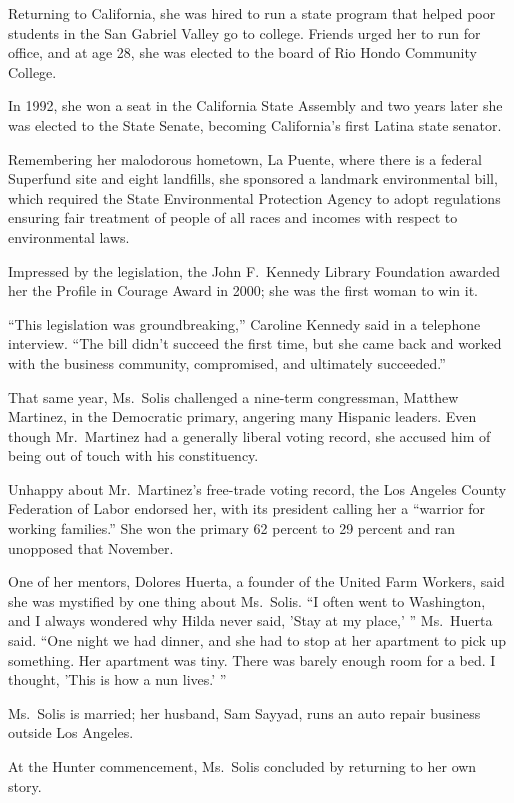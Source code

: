 ﻿\documentclass[12pt]{article}
\begin{document}
Returning to California, she was hired to run a state program that helped poor students in the San
Gabriel Valley go to college. Friends urged her to run for office, and at age 28, she was elected to
the board of Rio Hondo Community College.

In 1992, she won a seat in the California State Assembly and two years later she was elected to the
State Senate, becoming California's first Latina state senator.

Remembering her malodorous hometown, La Puente, where there is a federal Superfund site and eight
landfills, she sponsored a landmark environmental bill, which required the State Environmental
Protection Agency to adopt regulations ensuring fair treatment of people of all races and incomes
with respect to environmental laws.

Impressed by the legislation, the John F.~Kennedy Library Foundation awarded her the Profile in
Courage Award in 2000; she was the first woman to win it.

``This legislation was groundbreaking,'' Caroline Kennedy said in a telephone interview. ``The bill
didn't succeed the first time, but she came back and worked with the business community,
compromised, and ultimately succeeded.''

That same year, Ms.~Solis challenged a nine-term congressman, Matthew Martinez, in the Democratic
primary, angering many Hispanic leaders. Even though Mr.~Martinez had a generally liberal voting
record, she accused him of being out of touch with his constituency.

Unhappy about Mr.~Martinez's free-trade voting record, the Los Angeles County Federation of Labor
endorsed her, with its president calling her a ``warrior for working families.'' She won the primary
62 percent to 29 percent and ran unopposed that November.

One of her mentors, Dolores Huerta, a founder of the United Farm Workers, said she was mystified by
one thing about Ms.~Solis. ``I often went to Washington, and I always wondered why Hilda never said,
'Stay at my place,' '' Ms.~Huerta said. ``One night we had dinner, and she had to stop at her
apartment to pick up something. Her apartment was tiny. There was barely enough room for a bed. I
thought, 'This is how a nun lives.' ''

Ms.~Solis is married; her husband, Sam Sayyad, runs an auto repair business outside Los Angeles.

At the Hunter commencement, Ms.~Solis concluded by returning to her own story.
\end{document}

